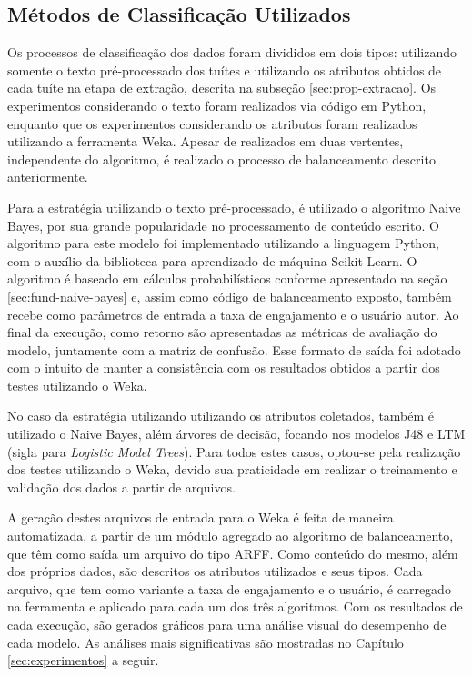 \documentclass[oneside,openright,12pt]{ufsm_2015} %
\begin{document}

\subsection{Métodos de Classificação Utilizados}
\label{sec:prop-class-metodos}

    \par Os processos de classificação dos dados foram divididos em dois tipos: utilizando somente o texto pré-processado dos tuítes e utilizando os atributos obtidos de cada tuíte na etapa de extração, descrita na subseção \ref{sec:prop-extracao}. Os experimentos considerando o texto foram realizados via código em Python, enquanto que os experimentos considerando os atributos foram realizados utilizando a ferramenta Weka. Apesar de realizados em duas vertentes, independente do algoritmo, é realizado o processo de balanceamento descrito anteriormente.
    
    \par Para a estratégia utilizando o texto pré-processado, é utilizado o algoritmo Naive Bayes, por sua grande popularidade no processamento de conteúdo escrito. O algoritmo para este modelo foi implementado utilizando a linguagem Python, com o auxílio da biblioteca para aprendizado de máquina Scikit-Learn. O algoritmo é baseado em cálculos probabilísticos conforme apresentado na seção \ref{sec:fund-naive-bayes} e, assim como código de balanceamento exposto, também recebe como parâmetros de entrada a taxa de engajamento e o usuário autor. Ao final da execução, como retorno são apresentadas as métricas de avaliação do modelo, juntamente com a matriz de confusão. Esse formato de saída foi adotado com o intuito de manter a consistência com os resultados obtidos a partir dos testes utilizando o Weka.
    
    \par No caso da estratégia utilizando utilizando os atributos coletados, também é utilizado o Naive Bayes, além árvores de decisão, focando nos modelos J48 e LTM (sigla para \textit{Logistic Model Trees}). Para todos estes casos, optou-se pela realização dos testes utilizando o Weka, devido sua praticidade em realizar o treinamento e validação dos dados a partir de arquivos.
    
    \par A geração destes arquivos de entrada para o Weka é feita de maneira automatizada, a partir de um módulo agregado ao algoritmo de balanceamento, que têm como saída um arquivo do tipo ARFF. Como conteúdo do mesmo, além dos próprios dados, são descritos os atributos utilizados e seus tipos. Cada arquivo, que tem como variante a taxa de engajamento e o usuário, é carregado na ferramenta e aplicado para cada um dos três algoritmos. Com os resultados de cada execução, são gerados gráficos para uma análise visual do desempenho de cada modelo. As análises mais significativas são mostradas no Capítulo \ref{sec:experimentos} a seguir.
\end{document}
